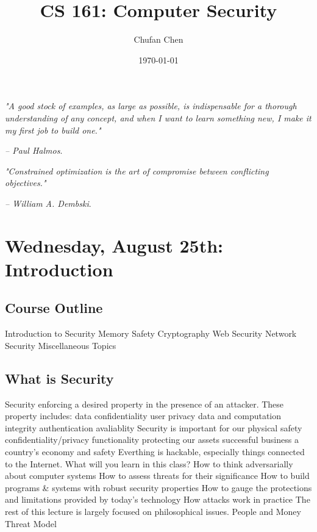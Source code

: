 \documentclass[11 pt]{scrartcl}
\begin{document}
 
\title{\Large CS 161: Computer Security}
\author{\large Chufan Chen}
\date{\large\today}

\maketitle 

\begin{center}
\begin{displayquote}
    \emph{"A good stock of examples, as large as possible, is indispensable for a thorough understanding of any concept, and when I want to learn something new, I make it my first job to build one."} \\ \begin{flushright} \emph{– Paul Halmos}.  \end{flushright}
\end{displayquote}
\begin{displayquote}
    \emph{"Constrained optimization is the art of compromise between conflicting objectives."} \\ \begin{flushright} \emph{– William A. Dembski}.  \end{flushright}
\end{displayquote}
\end{center}


\tableofcontents 

\newpage

\section{Wednesday, August 25th: Introduction}
\subsection{Course Outline}
\itemnum
    \ii Introduction to Security
    \ii Memory Safety
    \ii Cryptography
    \ii Web Security
    \ii Network Security
    \ii Miscellaneous Topics
\itemend

\subsection{What is Security}
Security enforcing a desired property in the presence of an attacker. These property includes:
\itemnum
    \ii data confidentiality
    \ii user privacy
    \ii data and computation integrity
    \ii authentication
    \ii avaliablity
\itemend
Security is important for our
\itemnum
    \ii physical safety
    \ii confidentiality/privacy
    \ii functionality
    \ii protecting our assets
    \ii successful business
    \ii a country’s economy and safety
\itemend
Everthing is hackable, especially things connected to the Internet.\newline
What will you learn in this class?
\itemnum
    \ii How to think adversarially about computer systems
    \ii How to assess threats for their significance
    \ii How to build programs \& systems with robust security properties
    \ii How to gauge the protections and limitations provided by today's technology
    \ii How attacks work in practice
\itemend
The rest of this lecture is largely focused on philosophical issues.
\itemnum
    \ii People and Money
    \ii Threat Model
\itemend
\end{document}
